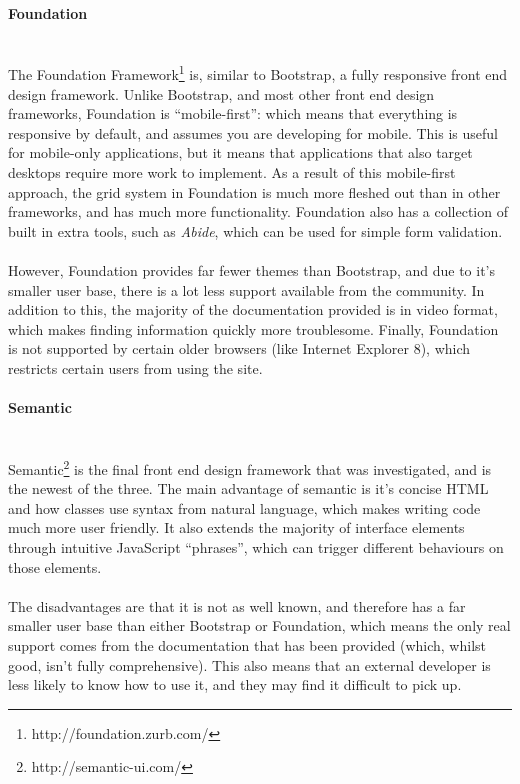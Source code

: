 \paragraph{Foundation}\ \\
The Foundation Framework\footnote{http://foundation.zurb.com/} is, similar to Bootstrap, a fully responsive front end design framework. Unlike Bootstrap, and most other front end design frameworks, Foundation is ``mobile-first'': which means that everything is responsive by default, and assumes you are developing for mobile. This is useful for mobile-only applications, but it  means that applications that also target desktops require more work to implement. As a result of this mobile-first approach, the grid system in Foundation is much more fleshed out than in other frameworks, and has much more functionality. Foundation also has a collection of built in extra tools, such as \textit{Abide}, which can be used for simple form validation.\ \\
\ \\
However, Foundation provides far fewer themes than Bootstrap, and due to it's smaller user base, there is a lot less support available from the community. In addition to this, the majority of the documentation provided is in video format, which makes finding information quickly more troublesome. Finally, Foundation is not supported by certain older browsers (like Internet Explorer 8), which restricts certain users from using the site.

\paragraph{Semantic}\ \\
Semantic\footnote{http://semantic-ui.com/} is the final front end design framework that was investigated, and is the newest of the three. The main advantage of semantic is it's concise HTML and how classes use syntax from natural language, which makes writing code much more user friendly. It also extends the majority of interface elements through intuitive JavaScript ``phrases'', which can trigger different behaviours on those elements.\ \\
\ \\
The disadvantages are that it is not as well known, and therefore has a far smaller user base than either Bootstrap or Foundation, which means the only real support comes from the documentation that has been provided (which, whilst good, isn't fully comprehensive). This also means that an external developer is less likely to know how to use it, and they may find it difficult to pick up.


